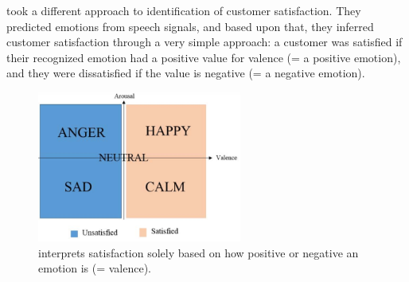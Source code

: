 \newline\newline \citet{Kamaruddin:2016:MeasuringCustomerSatisfaction} took a different approach to identification of customer satisfaction. They predicted emotions from speech signals, and based upon that, they inferred customer satisfaction through a very simple approach: a customer was satisfied if their recognized emotion had a positive value for valence (= a positive emotion), and they were dissatisfied if the value is negative (= a negative emotion).

\begin{figure}[H]
  \begin{center}
  \includegraphics[angle=0, width=0.6\textwidth]{Figures/Satisfaction_from_VA.PNG}
  \caption{\citet{Kamaruddin:2016:MeasuringCustomerSatisfaction} interprets satisfaction solely based on how positive or negative an emotion is (= valence).}
  \label{fig:SatisfactionFromVA}
  \end{center}
\end{figure}

